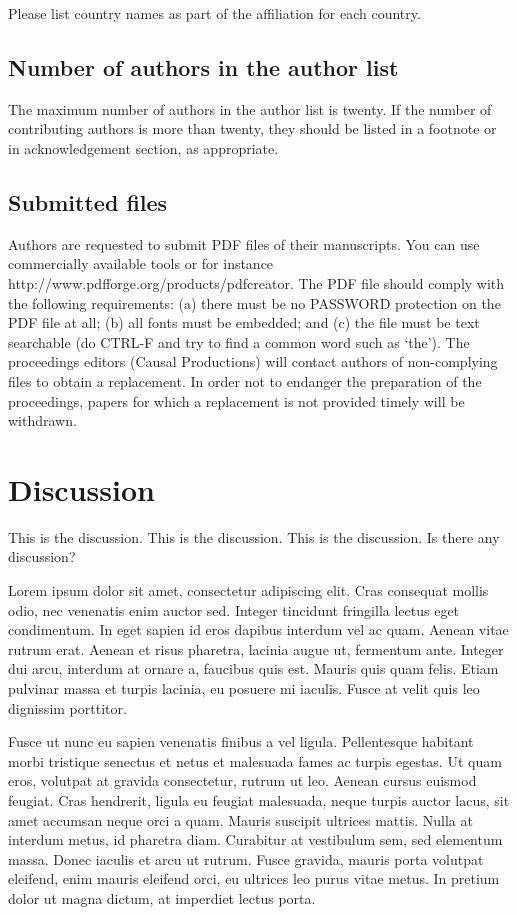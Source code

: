 \documentclass[a4paper]{article}
\begin{document}
Please list country names as part of the affiliation for each country.

\subsection{Number of authors in the author list}

The maximum number of authors in the author list is twenty. If the number of contributing authors is more than twenty, they should be listed in a footnote or in acknowledgement section, as appropriate.

\subsection{Submitted files}

Authors are requested to submit PDF files of their manu­scripts. You can use commercially available tools or for instance http://www.pdfforge.org/products/pdfcreator. The PDF file should comply with the following requirements: (a) there must be no PASSWORD protection on the PDF file at all; (b) all fonts must be embedded; and (c) the file must be text searchable (do CTRL-F and try to find a common word such as ‘the’). The proceedings editors (Causal Productions) will contact authors of non-complying files to obtain a replacement. In order not to endanger the preparation of the proceedings, papers for which a replacement is not provided timely will be withdrawn.

\section{Discussion}

This is the discussion. This is the discussion. This is the discussion. Is there any discussion?

Lorem ipsum dolor sit amet, consectetur adipiscing elit. Cras consequat mollis odio, nec venenatis enim auctor sed. Integer tincidunt fringilla lectus eget condimentum. In eget sapien id eros dapibus interdum vel ac quam. Aenean vitae rutrum erat. Aenean et risus pharetra, lacinia augue ut, fermentum ante. Integer dui arcu, interdum at ornare a, faucibus quis est. Mauris quis quam felis. Etiam pulvinar massa et turpis lacinia, eu posuere mi iaculis. Fusce at velit quis leo dignissim porttitor.

Fusce ut nunc eu sapien venenatis finibus a vel ligula. Pellentesque habitant morbi tristique senectus et netus et malesuada fames ac turpis egestas. Ut quam eros, volutpat at gravida consectetur, rutrum ut leo. Aenean cursus euismod feugiat. Cras hendrerit, ligula eu feugiat malesuada, neque turpis auctor lacus, sit amet accumsan neque orci a quam. Mauris suscipit ultrices mattis. Nulla at interdum metus, id pharetra diam. Curabitur at vestibulum sem, sed elementum massa. Donec iaculis et arcu ut rutrum. Fusce gravida, mauris porta volutpat eleifend, enim mauris eleifend orci, eu ultrices leo purus vitae metus. In pretium dolor ut magna dictum, at imperdiet lectus porta.
\end{document}
